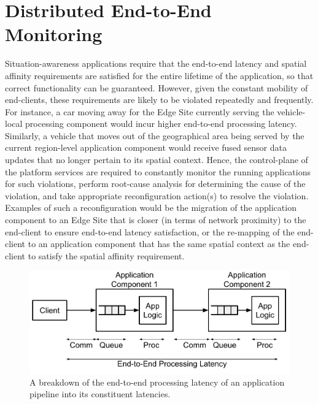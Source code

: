 \section{Distributed End-to-End Monitoring}
Situation-awareness applications require that the end-to-end latency and spatial affinity requirements are satisfied for the entire lifetime of the application, so that correct functionality can be guaranteed. However, given the constant mobility of end-clients, these requirements are likely to be violated repeatedly and frequently. For instance, a car moving away for the Edge Site currently serving the vehicle-local processing component would incur higher end-to-end processing latency. Similarly, a vehicle that moves out of the geographical area being served by the current region-level application component would receive fused sensor data updates that no longer pertain to its spatial context. Hence, the control-plane of the platform services are required to constantly monitor the running applications for such violations, perform root-cause analysis for determining the cause of the violation, and take appropriate reconfiguration action(s) to resolve the violation. Examples of such a reconfiguration would be the migration of the application component to an Edge Site that is closer (in terms of network proximity) to the end-client to ensure end-to-end latency satisfaction, or the re-mapping of the end-client to an application component that has the same spatial context as the end-client to satisfy the spatial affinity requirement.
\begin{figure}
\centering
\includegraphics[width=0.75\linewidth]{figures/mechanisms/monitoring/pipeline_latencies}
\caption{A breakdown of the end-to-end processing latency of an application pipeline into its constituent latencies.}
\label{fig:pipeline_latencies}
\end{figure}
